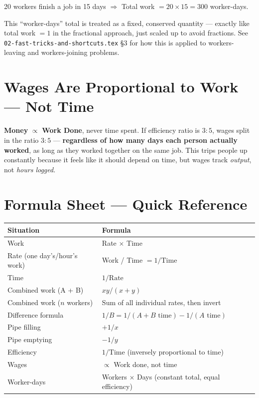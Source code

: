 \documentclass[11pt]{article}
\begin{document}
\begin{examplebox}
20 workers finish a job in 15 days $\Rightarrow$ Total work $= 20 \times 15 = 300$ worker-days.
\end{examplebox}

This ``worker-days'' total is treated as a fixed, conserved quantity --- exactly like total work $=
1$ in the fractional approach, just scaled up to avoid fractions. See
\texttt{02-fast-tricks-and-shortcuts.tex} \S3 for how this is applied to workers-leaving and
workers-joining problems.

\section{Wages Are Proportional to Work --- Not Time}
\begin{warnbox}
\textbf{Money} $\propto$ \textbf{Work Done}, never time spent. If efficiency ratio is $3:5$, wages
split in the ratio $3:5$ --- \textbf{regardless of how many days each person actually worked}, as
long as they worked together on the same job. This trips people up constantly because it feels like
it should depend on time, but wages track \emph{output}, not \emph{hours logged}.
\end{warnbox}

\section{Formula Sheet --- Quick Reference}
\begin{formulabox}
\centering
\begin{tabular}{ll}
\toprule
\textbf{Situation} & \textbf{Formula} \\
\midrule
Work & Rate $\times$ Time \\
Rate (one day's/hour's work) & Work / Time $= 1/\text{Time}$ \\
Time & $1/\text{Rate}$ \\
Combined work (A + B) & $xy/(x+y)$ \\
Combined work ($n$ workers) & Sum of all individual rates, then invert \\
Difference formula & $1/B = 1/(A{+}B \text{ time}) - 1/(A \text{ time})$ \\
Pipe filling & $+1/x$ \\
Pipe emptying & $-1/y$ \\
Efficiency & $1/\text{Time}$ (inversely proportional to time) \\
Wages & $\propto$ Work done, not time \\
Worker-days & Workers $\times$ Days (constant total, equal efficiency) \\
\bottomrule
\end{tabular}
\end{formulabox}
\end{document}
